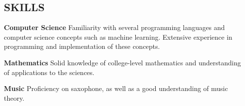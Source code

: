 \documentclass[line,margin]{res}
\begin{document}
\begin{resume}
\section{SKILLS}
        {\bf\rmfamily Computer Science} \quad
        Familiarity with several programming languages and computer science concepts such as machine learning.
        Extensive experience in programming and implementation of these concepts.

        {\bf\rmfamily Mathematics} \quad
        Solid knowledge of college-level mathematics and understanding of applications to the sciences.



        {\bf\rmfamily Music} \quad
        Proficiency on saxophone, as well as a good understanding of music theory.


\end{resume}
\end{document}
